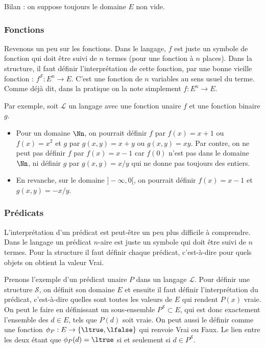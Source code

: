 \documentclass[11pt,class=report,crop=false]{standalone}
\begin{document}
Bilan : on suppose toujours le domaine $E$ non vide.

\subsubsection{Fonctions}

Revenons un peu sur les fonctions. Dans le langage, $f$ est juste un symbole de fonction qui doit être suivi de $n$ termes (pour une fonction à $n$ places).
Dans la structure, il faut définir l'interprétation de cette fonction, par une bonne vieille fonction : $f^{\mathcal{S}} : E^n \to E$. C'est une fonction de $n$ variables au sens usuel du terme. Comme déjà dit, dans la pratique on la note simplement $f : E^n \to E$.

Par exemple, soit $\mathcal{L}$ un langage avec une fonction unaire $f$ et une fonction binaire $g$.
\begin{itemize}
	\item Pour un domaine $\Nn$, on pourrait définir $f$ par $f(x) = x+1$ ou $f(x)=x^2$
	et $g$ par $g(x,y) = x+y$ ou $g(x,y) = xy$. Par contre, on ne peut pas définir $f$ par $f(x) = x-1$ car $f(0)$ n'est pas dans le domaine $\Nn$, ni définir $g$ par $g(x,y) = x/y$ qui ne donne pas toujours des entiers.
	
	\item En revanche, sur le domaine $]-\infty,0[$, on pourrait définir $f(x) = x-1$ et $g(x,y)=-x/y$.
\end{itemize}


\subsubsection{Prédicats}

L'interprétation d'un prédicat est peut-être un peu plus difficile à comprendre.
Dans le langage un prédicat $n$-aire est juste un symbole qui doit être suivi de $n$ termes.
Pour la structure il faut définir chaque prédicat, c'est-à-dire pour quels objets on obtient la valeur Vrai.

Prenons l'exemple d'un prédicat unaire $P$ dans un langage $\mathcal{L}$.
Pour définir une structure $\mathcal{S}$, on définit son domaine $E$ et ensuite il faut définir l'interprétation du prédicat, c'est-à-dire quelles sont toutes les valeurs de $E$ qui rendent $P(x)$ vraie. On peut le faire en définissant un sous-ensemble $P^{\mathcal{S}} \subset E$, qui est donc exactement l'ensemble des $d \in E$, tels que $P(d)$ soit vraie.
On peut aussi le définir comme une fonction $\phi_P : E \to \{ \ltrue,\lfalse \}$ qui renvoie Vrai ou Faux. Le lien entre les deux étant que $\phi_P(d) = \ltrue$ si et seulement si $d \in P^{\mathcal{S}}$.
\end{document}
